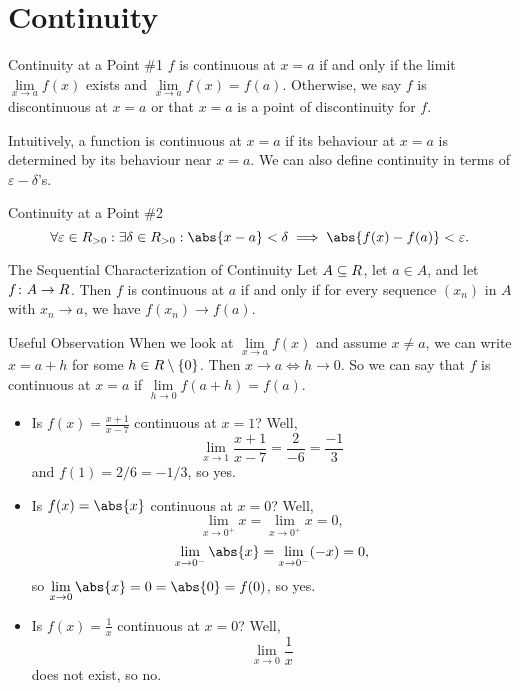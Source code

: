 \section{Continuity}
\begin{Definition}{Continuity at a Point \#1}{}
    $ f $ is continuous at $ x=a $ if and only if the limit $ \lim\limits_{{x} \to {a}}f(x) $ exists and
    $ \lim\limits_{{x} \to {a}}f(x)=f(a) $.
    \tcblower{}
    Otherwise, we say $ f $ is discontinuous at $ x=a $ or that $ x=a $ is a point of discontinuity for $ f $.
\end{Definition}
Intuitively, a function is continuous at $ x=a $ if its behaviour at $ x=a $ is determined by its behaviour near $ x=a $. We can also define
continuity in terms of $ \varepsilon-\delta $'s.
\begin{Definition}{Continuity at a Point \#2}{}
    \[ \forall \varepsilon\in\R_{>0}:\exists \delta\in\R_{>0}:\abs{x-a}<\delta\implies \abs{f(x)-f(a)}<\varepsilon. \]
\end{Definition}
\begin{Theorem}{The Sequential Characterization of Continuity}{}
    Let $ A\subseteq\relax{R} $, let $ a\in A $, and let $ f\colon A\to \relax{R} $. Then $ f $
    is continuous at $ a $ if and only if for every sequence $ (x_n) $ in $ A $ with $ x_n\to a $, we have $ f(x_n)\to f(a) $.
\end{Theorem}
\begin{Remark}{Useful Observation}{}
    When we look at $ \lim\limits_{{x} \to {a}}f(x) $ and assume $ x\ne a $,
    we can write $ x=a+h $ for some $ h\in\relax{R}\setminus\{0\} $. Then $ x\to a\iff  h\to 0  $. So we can say that $ f $
    is continuous at $ x=a $ if $ \lim\limits_{{h} \to {0}}f(a+h)=f(a) $.
\end{Remark}
\begin{Example}{}{}
    \begin{itemize}
        \item Is $ f(x)=\frac{x+1}{x-7} $ continuous at $ x=1 $? Well,
              \[ \lim\limits_{{x} \to {1}}\frac{x+1}{x-7}=\frac{2}{-6}=\frac{-1}{3} \]
              and $ f(1)=2/6=-1/3 $, so yes.
        \item Is $ f(x)=\abs{x} $ continuous at $ x=0 $? Well,
              \[ \lim\limits_{{x} \to {0^+}}x=\lim\limits_{{x} \to {0^+}}x=0, \]
              \[ \lim\limits_{{x} \to {0^-}}\abs{x}=\lim\limits_{{x} \to {0^-}}(-x)=0, \]
              so $ \lim\limits_{{x} \to {0}}\abs{x}=0=\abs{0}=f(0) $, so yes.
        \item Is $ f(x)=\frac{1}{x} $ continuous at $ x=0 $? Well,
              \[ \lim\limits_{{x} \to {0}}\frac{1}{x} \]
              does not exist, so no.
    \end{itemize}
\end{Example}

